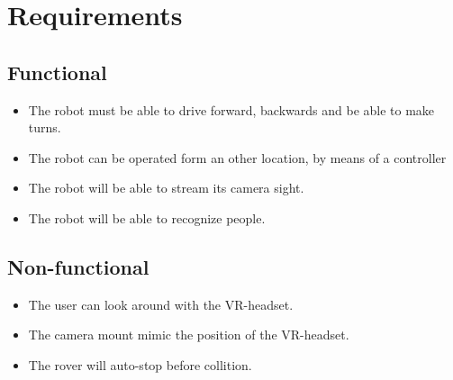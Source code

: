 \section{Requirements}

\subsection{Functional}
\begin{itemize}
  \item The robot must be able to drive forward, backwards and be able to make turns.
  \item The robot can be operated form an other location, by means of a controller
  \item The robot will be able to stream its camera sight.
  \item The robot will be able to recognize people.
\end{itemize}

\subsection{Non-functional}
\begin{itemize}
    \item The user can look around with the VR-headset.
    \item The camera mount mimic the position of the VR-headset.
    \item The rover will auto-stop before collition.
\end{itemize}
